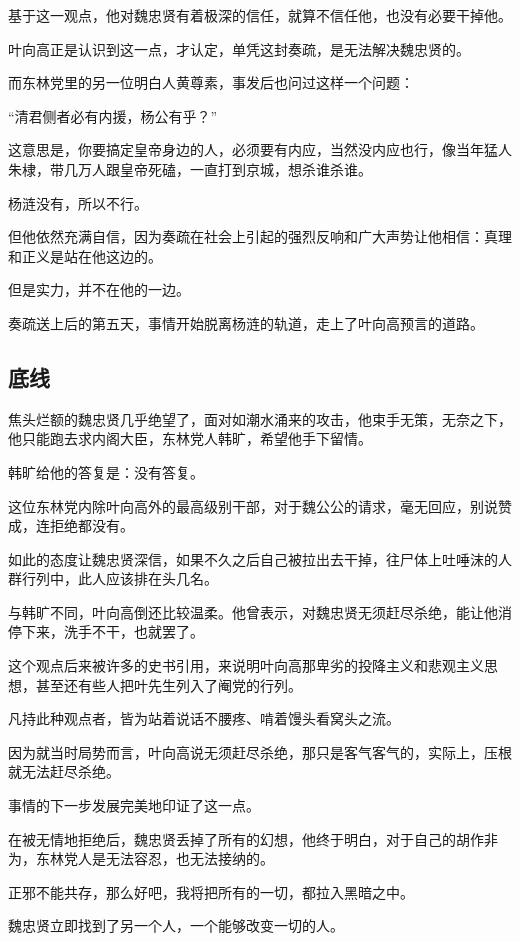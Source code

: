 \begin{multicols}{\theparacolNo}
		基于这一观点，他对魏忠贤有着极深的信任，就算不信任他，也没有必要干掉他。

		叶向高正是认识到这一点，才认定，单凭这封奏疏，是无法解决魏忠贤的。

		而东林党里的另一位明白人黄尊素，事发后也问过这样一个问题：

		“清君侧者必有内援，杨公有乎？”

		这意思是，你要搞定皇帝身边的人，必须要有内应，当然没内应也行，像当年猛人朱棣，带几万人跟皇帝死磕，一直打到京城，想杀谁杀谁。

		杨涟没有，所以不行。

		但他依然充满自信，因为奏疏在社会上引起的强烈反响和广大声势让他相信：真理和正义是站在他这边的。

		但是实力，并不在他的一边。

		奏疏送上后的第五天，事情开始脱离杨涟的轨道，走上了叶向高预言的道路。

		\subsection{底线}
		焦头烂额的魏忠贤几乎绝望了，面对如潮水涌来的攻击，他束手无策，无奈之下，他只能跑去求内阁大臣，东林党人韩旷，希望他手下留情。

		韩旷给他的答复是：没有答复。

		这位东林党内除叶向高外的最高级别干部，对于魏公公的请求，毫无回应，别说赞成，连拒绝都没有。

		如此的态度让魏忠贤深信，如果不久之后自己被拉出去干掉，往尸体上吐唾沫的人群行列中，此人应该排在头几名。

		与韩旷不同，叶向高倒还比较温柔。他曾表示，对魏忠贤无须赶尽杀绝，能让他消停下来，洗手不干，也就罢了。

		这个观点后来被许多的史书引用，来说明叶向高那卑劣的投降主义和悲观主义思想，甚至还有些人把叶先生列入了阉党的行列。

		凡持此种观点者，皆为站着说话不腰疼、啃着馒头看窝头之流。

		因为就当时局势而言，叶向高说无须赶尽杀绝，那只是客气客气的，实际上，压根就无法赶尽杀绝。

		事情的下一步发展完美地印证了这一点。

		在被无情地拒绝后，魏忠贤丢掉了所有的幻想，他终于明白，对于自己的胡作非为，东林党人是无法容忍，也无法接纳的。

		正邪不能共存，那么好吧，我将把所有的一切，都拉入黑暗之中。

		魏忠贤立即找到了另一个人，一个能够改变一切的人。


\end{multicols}
